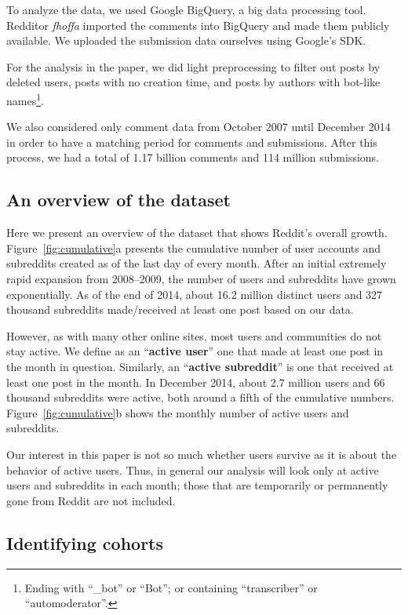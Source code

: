 \documentclass[10pt, oneside, onecolumn]{article}
\begin{document}
To analyze the data, we used Google BigQuery\cite{BigQuery}, a big data processing tool.
Redditor \textit{fhoffa} imported the comments into BigQuery and made them publicly available\cite{RedditDataset2}.  We uploaded the submission data ourselves using Google's SDK.

For the analysis in the paper, we did light preprocessing to filter out posts by deleted users, posts with no creation time, and posts by authors with bot-like names\footnote{Ending with ``\_bot'' or ``Bot''; or containing ``transcriber'' or ``automoderator''.}.

We also considered only comment data from October 2007 until December 2014 in order to have a matching period for comments and submissions. After this process, we had a total of 1.17 billion comments and 114 million submissions.

\subsection{An overview of the dataset}

Here we present an overview of the dataset that shows Reddit's overall growth.  Figure~\ref{fig:cumulative}a presents the cumulative number of user accounts and subreddits created as of the last day of every month. After an initial extremely rapid expansion from 2008--2009, the number of users and subreddits have grown exponentially.  As of the end of 2014, about 16.2 million distinct users and 327 thousand subreddits made/received at least one post based on our data.

However, as with many other online sites, most users \cite{Scellato2011,Hughes2009,Java2007} and communities \cite{Arguello2006} do not stay active. We define as an ``\textbf{active user}'' one that made at least one post in the month in question. Similarly, an ``\textbf{active subreddit}'' is one that received at least one post in the month. In December 2014, about 2.7 million users and 66 thousand subreddits were active, both around a fifth of the cumulative numbers. Figure~\ref{fig:cumulative}b shows the monthly number of active users and subreddits.

Our interest in this paper is not so much whether users survive as it is about the behavior of active users.  Thus, 
in general our analysis will look only at active users and subreddits in each month; those that are temporarily or permanently gone from Reddit are not included.  

\subsection{Identifying cohorts}
\end{document}
